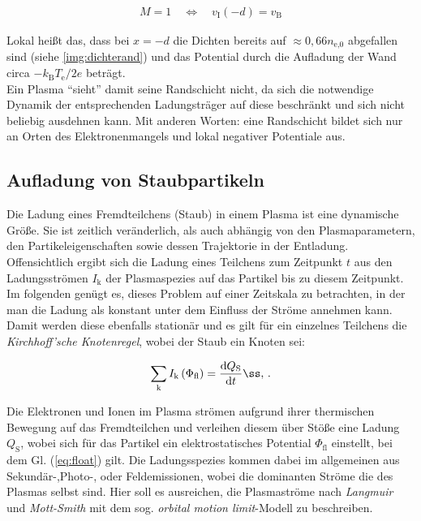 \documentclass[numbers=noenddot,a4paper]{scrartcl}
\newcommand{\diff}{\textnormal{d}}
\newcommand{\ix}[1]{_\text{#1}}
\newcommand{\tilt}[1]{\textit{#1}}
\begin{document}
				\begin{align}
					M=1 \quad \Leftrightarrow \quad v\ix{I}\left(-d\right)=v\ix{B} \label{eq:bohmkritzwei}
				\end{align}
				
			Lokal heißt das, dass bei $x=-d$ die Dichten bereits auf $\approx0,66n\ix{e,0}$ abgefallen sind (siehe \ref{img:dichterand}) und das Potential durch die Aufladung der Wand circa $-k\ix{B}T\ix{e}/2e$ beträgt.\\
			Ein Plasma "`sieht"' damit seine Randschicht nicht, da sich die notwendige Dynamik der entsprechenden Ladungsträger auf diese beschränkt und sich nicht beliebig ausdehnen kann. Mit anderen Worten: eine Randschicht bildet sich nur an Orten des Elektronenmangels und lokal negativer Potentiale aus.
				
		\subsection{Aufladung von Staubpartikeln}\label{subsec:ströme}
		
			Die Ladung eines Fremdteilchens (Staub) in einem Plasma ist eine dynamische Größe. Sie ist zeitlich veränderlich, als auch abhängig von den Plasmaparametern, den Partikeleigenschaften sowie dessen Trajektorie in der Entladung. Offensichtlich ergibt sich die Ladung eines Teilchens zum Zeitpunkt $t$ aus den Ladungsströmen $I\ix{k}$ der Plasmaspezies auf das Partikel bis zu diesem Zeitpunkt. Im folgenden genügt es, dieses Problem auf einer Zeitskala zu betrachten, in der man die Ladung als konstant unter dem Einfluss der Ströme annehmen kann. Damit werden diese ebenfalls stationär und es gilt für ein einzelnes Teilchens die \tilt{Kirchhoff'sche Knotenregel}, wobei der Staub ein Knoten sei:
			
				\begin{align}
					\sum_{\text{k}} I\ix{k}\left(\Phi\ix{fl}\right)=\frac{\diff Q\ix{S}}{\diff t} ß,\, . \label{eq:float}
				\end{align}

		Die Elektronen und Ionen im Plasma strömen aufgrund ihrer thermischen Bewegung auf das Fremdteilchen und verleihen diesem über Stöße eine Ladung $Q\ix{S}$, wobei sich für das Partikel ein elektrostatisches Potential $\Phi\ix{fl}$ einstellt, bei dem Gl. (\ref{eq:float}) gilt. Die Ladungsspezies kommen dabei im allgemeinen aus Sekundär-,Photo-, oder Feldemissionen, wobei die dominanten Ströme die des Plasmas selbst sind. Hier soll es ausreichen, die Plasmaströme nach  \tilt{Langmuir} und \tilt{Mott-Smith} mit dem sog. \tilt{orbital motion limit}-Modell \cite{Langmuir26} zu beschreiben. 
		
\end{document}
